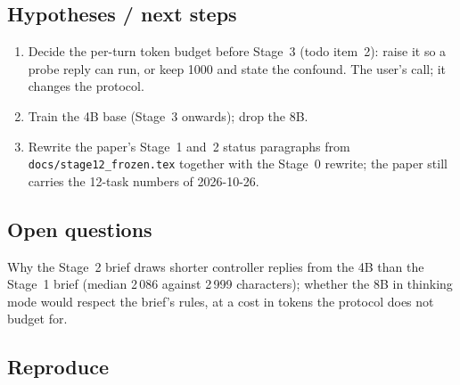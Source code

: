 \documentclass[11pt,a4paper]{article}
\begin{document}
\subsection*{Hypotheses / next steps}

\begin{enumerate}[nosep]
\item Decide the per-turn token budget before Stage~3 (todo item~2): raise it
  so a probe reply can run, or keep 1000 and state the confound. The user's
  call; it changes the protocol.
\item Train the 4B base (Stage~3 onwards); drop the 8B.
\item Rewrite the paper's Stage~1 and~2 status paragraphs from
  \texttt{docs/stage12\_frozen.tex} together with the Stage~0 rewrite; the
  paper still carries the 12-task numbers of 2026-10-26.
\end{enumerate}

\subsection*{Open questions}

Why the Stage~2 brief draws shorter controller replies from the 4B than the
Stage~1 brief (median 2\,086 against 2\,999 characters); whether the 8B in
thinking mode would respect the brief's rules, at a cost in tokens the
protocol does not budget for.

\subsection*{Reproduce}
\end{document}
